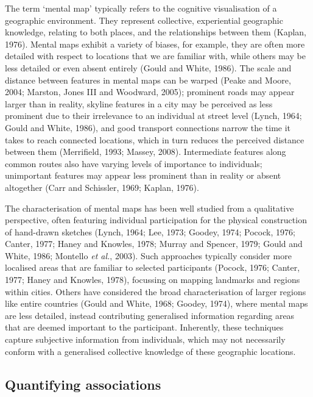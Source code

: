 \documentclass[
  letterpaper,
  11pt,
  english,
  onehalfspacing,
  headsepline]{MastersDoctoralThesis}
\begin{document}
The term `mental map' typically refers to the cognitive visualisation of
a geographic environment. They represent collective, experiential
geographic knowledge, relating to both places, and the relationships
between them (Kaplan, 1976). Mental maps exhibit a variety of biases,
for example, they are often more detailed with respect to locations that
we are familiar with, while others may be less detailed or even absent
entirely (Gould and White, 1986). The scale and distance between
features in mental maps can be warped (Peake and Moore, 2004; Marston,
Jones III and Woodward, 2005); prominent roads may appear larger than in
reality, skyline features in a city may be perceived as less prominent
due to their irrelevance to an individual at street level (Lynch, 1964;
Gould and White, 1986), and good transport connections narrow the time
it takes to reach connected locations, which in turn reduces the
perceived distance between them (Merrifield, 1993; Massey, 2008).
Intermediate features along common routes also have varying levels of
importance to individuals; unimportant features may appear less
prominent than in reality or absent altogether (Carr and Schissler,
1969; Kaplan, 1976).

The characterisation of mental maps has been well studied from a
qualitative perspective, often featuring individual participation for
the physical construction of hand-drawn sketches (Lynch, 1964; Lee,
1973; Goodey, 1974; Pocock, 1976; Canter, 1977; Haney and Knowles, 1978;
Murray and Spencer, 1979; Gould and White, 1986; Montello \emph{et al.},
2003). Such approaches typically consider more localised areas that are
familiar to selected participants (Pocock, 1976; Canter, 1977; Haney and
Knowles, 1978), focussing on mapping landmarks and regions within
cities. Others have considered the broad characterisation of larger
regions like entire countries (Gould and White, 1968; Goodey, 1974),
where mental maps are less detailed, instead contributing generalised
information regarding areas that are deemed important to the
participant. Inherently, these techniques capture subjective information
from individuals, which may not necessarily conform with a generalised
collective knowledge of these geographic locations.

\hypertarget{quantifying-associations}{%
\subsection{Quantifying associations}\label{quantifying-associations}}
\end{document}
